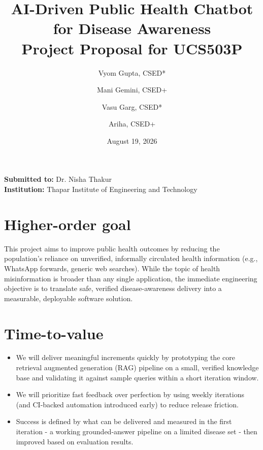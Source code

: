 \documentclass[11pt,a4paper]{article}
\title{\textbf{AI-Driven Public Health Chatbot for Disease Awareness} \\ \Large Project Proposal for UCS503P}
\author{Vyom Gupta, CSED* \and Mani Gemini, CSED+ \and Vasu Garg, CSED* \and Ariha, CSED+}
\date{August 19, 2026}
\begin{document}
\maketitle

\begin{center}
    \textbf{Submitted to:} Dr. Nisha Thakur \\
    \textbf{Institution:} Thapar Institute of Engineering and Technology
\end{center}

\vspace{0.5cm}

\section{Higher-order goal}
This project aims to improve public health outcomes by reducing the population's reliance on unverified, informally circulated health information (e.g., WhatsApp forwards, generic web searches). While the topic of health misinformation is broader than any single application, the immediate engineering objective is to translate safe, verified disease-awareness delivery into a measurable, deployable software solution.

\section{Time-to-value}
\begin{itemize}
    \item We will deliver meaningful increments quickly by prototyping the core retrieval augmented generation (RAG) pipeline on a small, verified knowledge base and validating it against sample queries within a short iteration window.
    \item We will prioritize fast feedback over perfection by using weekly iterations (and CI-backed automation introduced early) to reduce release friction.
    \item Success is defined by what can be delivered and measured in the first iteration - a working grounded-answer pipeline on a limited disease set - then improved based on evaluation results.
\end{itemize}
\end{document}

